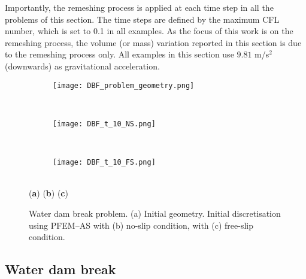 \documentclass[final,3p,times]{elsarticle}
\begin{document}
Importantly, the remeshing process is applied at each time step in all the problems of this section. The time steps are defined by the maximum CFL number, which is set to 0.1 in all examples.  As the focus of this work is on the remeshing process, the volume (or mass) variation reported in this section is due to the remeshing process only. All examples in this section use $9.81$ m/s$^2$ (downwards) as gravitational acceleration.


\begin{figure}[t!]
\captionsetup[subfigure]{labelformat=empty}
\centering 
	\hspace{-10mm}
	\begin{subfigure}[b]{0.32\textwidth}
		\texttt{[image: DBF\_problem\_geometry.png]}
		\caption{}
		\label{Fig:dbf_geometry_a}
	\end{subfigure}
	~ \hspace{5mm}
	\begin{subfigure}[b]{0.32\textwidth}	
		\texttt{[image: DBF\_t\_10\_NS.png]}
		\caption{}
		\label{Fig:dbf_geometry_b}
	\end{subfigure}
	~ \hspace{5mm}
	\begin{subfigure}[b]{0.12\textwidth}	
		\texttt{[image: DBF\_t\_10\_FS.png]}
		\caption{}
		\label{Fig:dbf_geometry_c}
	\end{subfigure}
	\\
	\vspace{-25mm}
	\hspace{-37mm} \footnotesize{(\textbf{a})} 
	\hspace{55mm} (\textbf{b})
	\hspace{56mm} (\textbf{c}) 
	\\
	\vspace{17mm}
	\caption{Water dam break problem. (a) Initial geometry. Initial discretisation using PFEM--AS with (b) no-slip condition, with (c) free-slip condition.}
\label{Fig:dbf_geometry}
\end{figure}

\subsection{Water dam break}
\end{document}
